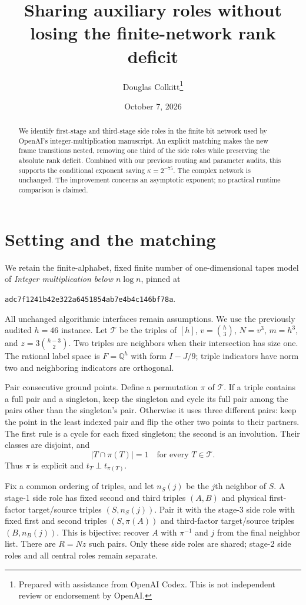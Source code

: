\documentclass[11pt]{article}
\title{Sharing auxiliary roles without losing the finite-network rank deficit}
\author{Douglas Colkitt\thanks{Prepared with assistance from OpenAI Codex. This is not independent review or endorsement by OpenAI.}}
\date{October 7, 2026}
\begin{document}
\maketitle
\begin{abstract}
We identify first-stage and third-stage side roles in the finite bit network
used by OpenAI's integer-multiplication manuscript. An explicit matching makes
the new frame transitions nested, removing one third of the side roles while
preserving the absolute rank deficit. Combined with our previous routing and
parameter audits, this supports the conditional exponent saving $\kappa=2^{-75}$.
The complex network is unchanged. The improvement concerns an asymptotic
exponent; no practical runtime comparison is claimed.
\end{abstract}

\section{Setting and the matching}
We retain the finite-alphabet, fixed finite number of one-dimensional tapes
model of \emph{Integer multiplication below $n\log n$}, pinned at
\begin{center}\texttt{adc7f1241b42e322a6451854ab7e4b4c146bf78a}.\end{center}
All unchanged algorithmic interfaces remain assumptions. We use the previously
audited $h=46$ instance. Let $\mathcal T$ be the triples of $[h]$,
$v=\binom h3$, $N=v^3$, $m=h^3$, and $z=3\binom{h-3}{2}$.
Two triples are neighbors when their intersection has size one.
The rational label space is $F=\mathbb Q^h$ with form $I-J/9$;
triple indicators have norm two and neighboring indicators are orthogonal.

Pair consecutive ground points. Define a permutation $\pi$ of $\mathcal T$.
If a triple contains a full pair and a singleton, keep the singleton and cycle
its full pair among the pairs other than the singleton's pair. Otherwise it
uses three different pairs: keep the point in the least indexed pair and flip
the other two points to their partners. The first rule is a cycle for each fixed
singleton; the second is an involution. Their classes are disjoint, and
\[
 |T\cap\pi(T)|=1\quad\text{for every }T\in\mathcal T.
\]
Thus $\pi$ is explicit and $t_T\perp t_{\pi(T)}$.

Fix a common ordering of triples, and let $n_S(j)$ be the $j$th neighbor of $S$.
A stage-1 side role has fixed second and third triples $(A,B)$ and physical
first-factor target/source triples $(S,n_S(j))$. Pair it with the stage-3 side
role with fixed first and second triples $(S,\pi(A))$ and third-factor
target/source triples $(B,n_B(j))$. This is bijective: recover $A$ with
$\pi^{-1}$ and $j$ from the final neighbor list. There are $R=Nz$ such pairs.
Only these side roles are shared; stage-2 side roles and all central roles
remain separate.
\end{document}
